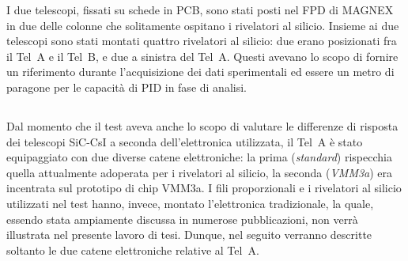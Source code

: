 I due telescopi, fissati su schede in PCB, sono stati posti nel FPD di MAGNEX in due delle colonne che solitamente ospitano i rivelatori al silicio.
Insieme ai due telescopi sono stati montati quattro rivelatori al silicio: due erano posizionati fra il Tel~A e il Tel~B, e due a sinistra del Tel~A.
Questi avevano lo scopo di fornire un riferimento durante l'acquisizione dei dati sperimentali ed essere un metro di paragone per le capacità di PID in fase di analisi.









\subsection{}


Dal momento che il test aveva anche lo scopo di valutare le differenze di risposta dei telescopi SiC-CsI a seconda dell'elettronica utilizzata, il Tel~A è stato equipaggiato con due diverse catene elettroniche:
la prima (\emph{standard}) rispecchia quella attualmente adoperata per i rivelatori al silicio, la seconda (\emph{VMM3a}) era incentrata sul prototipo di chip VMM3a.
I fili proporzionali e i rivelatori al silicio utilizzati nel test hanno, invece, montato l'elettronica tradizionale, la quale, essendo stata ampiamente discussa in numerose pubblicazioni, non verrà illustrata nel presente lavoro di tesi.
Dunque, nel seguito verranno descritte soltanto le due catene elettroniche relative al Tel~A.


